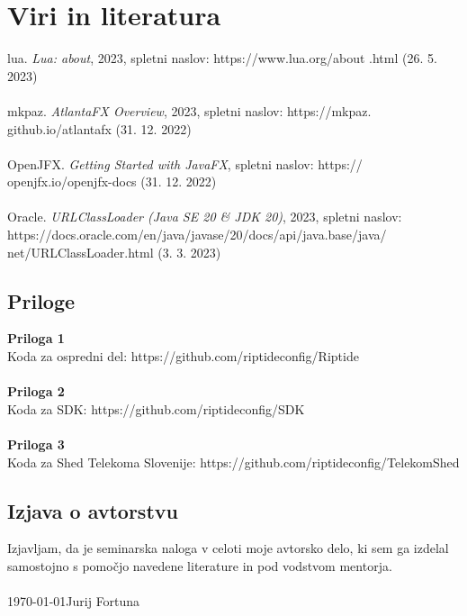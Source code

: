 \documentclass[12pt]{article}
\begin{document}
\section{Viri in literatura}
lua. \textit{Lua: about}, 2023, spletni naslov: https://www.lua.org/about
.html (26. 5. 2023)
\\\\
mkpaz. \textit{AtlantaFX Overview}, 2023, spletni naslov: https://mkpaz.
github.io/atlantafx (31. 12. 2022)
\\\\
OpenJFX. \textit{Getting Started with JavaFX}, spletni naslov: https://
openjfx.io/openjfx-docs (31. 12. 2022)
\\\\
Oracle. \textit{URLClassLoader (Java SE 20 \& JDK 20)}, 2023, spletni
naslov: https://docs.oracle.com/en/java/javase/20/docs/api/java.base/java/
net/URLClassLoader.html (3. 3. 2023)
\newpage

\begin{samepage}
	\thispagestyle{empty}
	\section*{Priloge}
	\textbf{Priloga 1}\\
	Koda za ospredni del: https://github.com/riptideconfig/Riptide
	\\\\
	\textbf{Priloga 2}\\
	Koda za SDK: https://github.com/riptideconfig/SDK
	\\\\
	\textbf{Priloga 3}\\
	Koda za Shed Telekoma Slovenije: https://github.com/riptideconfig/TelekomShed
\end{samepage}
\newpage

\begin{samepage}
	\thispagestyle{empty}
	\section*{Izjava o avtorstvu}
	Izjavljam, da je seminarska naloga v celoti moje avtorsko delo, ki sem
	ga izdelal samostojno s pomočjo navedene literature in pod vodstvom
	mentorja.
	\\\\
	\MMYYYYdate\today \hfill Jurij Fortuna
\end{samepage}
\end{document}
